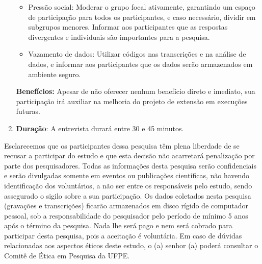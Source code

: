 \begin{enumerate}
\begin{itemize}
        \item Pressão social: Moderar o grupo focal ativamente, garantindo um espaço de participação para todos os participantes, e caso necessário, dividir em subgrupos menores. Informar aos participantes que as respostas divergentes e individuais são importantes para a pesquisa.
        \item Vazamento de dados: Utilizar códigos nas transcrições e na análise de dados, e informar aos participantes que os dados serão armazenados em ambiente seguro.
    \end{itemize}
    \textbf{Benefícios:} Apesar de não oferecer nenhum benefício direto e imediato, sua participação irá auxiliar na melhoria do projeto de extensão em execuções futuras.
    \item \textbf{Duração}: A entrevista durará entre 30 e 45 minutos.
\end{enumerate}

Esclarecemos que os participantes dessa pesquisa têm plena liberdade de se recusar a participar do estudo e que esta decisão não acarretará penalização por parte dos pesquisadores. Todas as informações desta pesquisa serão confidenciais e serão divulgadas somente em eventos ou publicações científicas, não havendo identificação dos voluntários, a não ser entre os responsáveis pelo estudo, sendo assegurado o sigilo sobre a sua participação. Os dados coletados nesta pesquisa (gravações e transcrições) ficarão armazenados em disco rígido de computador pessoal, sob a responsabilidade do pesquisador pelo período de mínimo 5 anos após o término da pesquisa. Nada lhe será pago e nem será cobrado para participar desta pesquisa, pois a aceitação é voluntária. Em caso de dúvidas relacionadas aos aspectos éticos deste estudo, o (a) senhor (a) poderá consultar o Comitê de Ética em Pesquisa da \gls{UFPE}.

